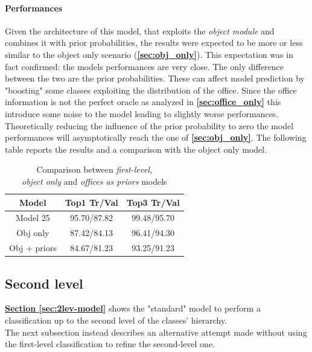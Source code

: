 \documentclass[12pt]{article}
\begin{document}
\paragraph{Performances}
Given the architecture of this model, that exploits the \textit{object module} and combines it with prior probabilities, the results were expected to be more or less similar to the object only scenario (\textbf{\ref{sec:obj_only}}). This expectation was in fact confirmed: the models performances are very close. The only difference between the two are the prior probabilities. These can affect model prediction by "boosting" some classes exploiting the distribution of the office. Since the office information is not the perfect oracle as analyzed in \textbf{\ref{sec:office_only}} this introduce some noise to the model leading to slightly worse performances. Theoretically reducing the influence of the prior probability to zero the model performances will asymptotically reach the one of \textbf{\ref{sec:obj_only}}. The following table reports the results and a comparison with the object only model.
\begin{table}[ht!]
    \begin{adjustwidth}{}{}
	    \centering
	    \small
	    \begin{tabular}{ |c|c|c| }
        \hline
        \textbf{Model} & \textbf{Top1 Tr/Val} & \textbf{Top3 Tr/Val}\\
        \hline
        Model 25 & 95.70/87.82 & 99.48/95.70 \\
        Obj only & 87.42/84.13 & 96.41/94.30 \\
        Obj + priors & 84.67/81.23 & 93.25/91.23 \\
        \hline
        \end{tabular}
	    \label{tb:relevant-bias}
    \end{adjustwidth}
    \captionsetup{justification   = centering}
    \caption{Comparison between \textit{first-level}, \\\textit{object only} and \textit{offices as priors} models}
\end{table}

\subsection{Second level}\label{sec:altern-lev2}
\hyperref[sec:2lev-model]{\textbf{Section \ref{sec:2lev-model}}} shows the "standard" model to perform a classification up to the second level of the classes' hierarchy.\\
The next subsection instead describes an alternative attempt made without using the first-level classification to refine the second-level one.
\end{document}
